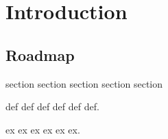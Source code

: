 \chapter{Introduction}

\section{Roadmap}

section section section
section section


\begin{group}
  
\begin{definition}
  def def def
  def
  def def.

\end{definition}

\begin{example}
  ex ex ex
  ex
  ex ex.

\end{example}
\end{group}
